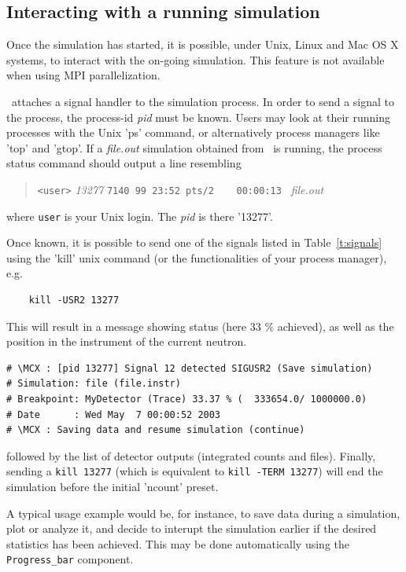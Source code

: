 \subsection{Interacting with a running simulation}

Once the simulation has started, it is possible, under Unix, Linux and Mac OS X systems, to interact with the on-going simulation. This feature is not available when using MPI parallelization.

\MCX\ attaches a signal handler to the simulation process. In order to send a signal to the process, the process-id {\it pid} must be known. Users may look at their running processes with the Unix 'ps' command, or alternatively process managers like 'top' and 'gtop'.
If a {\it file.out} simulation obtained from \MCX\ is running, the process status command should output a line resembling
\begin{quote}
  \verb|<user>| {\it 13277} \verb|7140 99 23:52 pts/2    00:00:13 | {\it file.out}\\
\end{quote}
where \verb+user+ is your Unix login. The {\it pid} is there '13277'.

Once known, it is possible to send one of the signals listed in Table~\ref{t:signals} using the 'kill' unix command (or the functionalities of your process manager), e.g.
\begin{verbatim}
    kill -USR2 13277
\end{verbatim}
This will result in a message showing status (here 33 \% achieved), as well as the position in the instrument of the current neutron.
\begin{verbatim}
# \MCX : [pid 13277] Signal 12 detected SIGUSR2 (Save simulation)
# Simulation: file (file.instr)
# Breakpoint: MyDetector (Trace) 33.37 % (  333654.0/ 1000000.0)
# Date      : Wed May  7 00:00:52 2003
# \MCX : Saving data and resume simulation (continue)
\end{verbatim}
followed by the list of detector outputs (integrated counts and files). Finally, sending a \verb+kill 13277+ (which is equivalent to \verb+kill -TERM 13277+) will end the simulation before the initial 'ncount' preset.

A typical usage example would be, for instance, to save data during a
simulation, plot or analyze it, and decide to interupt the simulation
earlier if the desired statistics has been achieved. This may be done automatically using the \verb+Progress_bar+ component.


